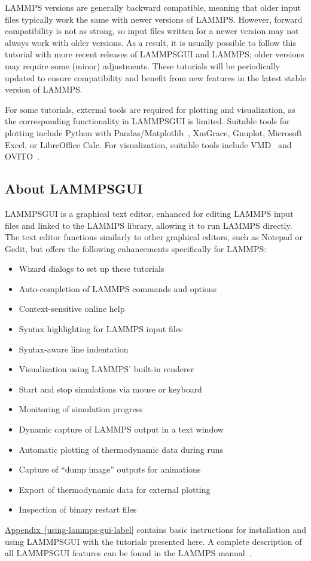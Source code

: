 \documentclass[9pt,tutorial]{livecoms}
\newcommand{\lammpsgui}{\textsf{LAMMPS\textendash GUI}}
\begin{document}
LAMMPS versions are generally backward compatible, meaning that older
input files typically work the same with newer versions of LAMMPS.
However, forward compatibility is not as strong, so input files written
for a newer version may not always work with older versions.  As a
result, it is usually possible to follow this tutorial with more recent
releases of \lammpsgui{} and LAMMPS; older versions may require some
(minor) adjustments.  These tutorials will be periodically updated to
ensure compatibility and benefit from new features in the latest stable
version of LAMMPS.

For some tutorials, external tools are required for plotting and
visualization, as the corresponding functionality in \lammpsgui{} is
limited.  Suitable tools for plotting include Python with
Pandas/Matplotlib~\cite{van1995python,hunter2007Matplotlib}, XmGrace,
Gnuplot, Microsoft Excel, or LibreOffice Calc.  For visualization,
suitable tools include VMD~\cite{vmd_home,humphrey1996vmd} and
OVITO~\cite{ovito_home,ovito_paper}.

\subsection{About \lammpsgui{}}

\lammpsgui{} is a graphical text editor, enhanced for editing LAMMPS
input files and linked to the LAMMPS library, allowing it to run LAMMPS
directly.  The text editor functions similarly to other graphical
editors, such as Notepad or Gedit, but offers the following enhancements
specifically for LAMMPS:
\begin{itemize}
  \item Wizard dialogs to set up these tutorials
  \item Auto-completion of LAMMPS commands and options
  \item Context-sensitive online help
  \item Syntax highlighting for LAMMPS input files
  \item Syntax-aware line indentation
  \item Visualization using LAMMPS' built-in renderer
  \item Start and stop simulations via mouse or keyboard
  \item Monitoring of simulation progress
  \item Dynamic capture of LAMMPS output in a text window
  \item Automatic plotting of thermodynamic data during runs
  \item Capture of ``dump image'' outputs for animations
  \item Export of thermodynamic data for external plotting
  \item Inspection of binary restart files
\end{itemize}
\hyperref[using-lammps-gui-label]{Appendix~\ref{using-lammps-gui-label}}
contains basic instructions for installation and using \lammpsgui{} with
the tutorials presented here.  A complete description of all \lammpsgui{}
features can be found in the LAMMPS manual~\cite{lammps_gui_docs}.
\end{document}

